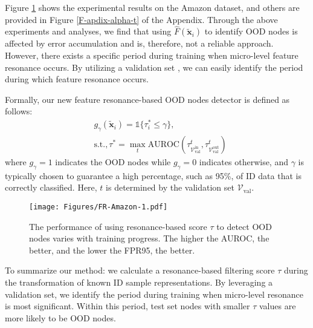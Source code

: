 Figure \ref{F-alpha-t} shows the experimental results on the Amazon dataset, and others are provided in Figure \ref{F-apdix-alpha-t} of the Appendix.  
Through the above experiments and analyses, we find that using $\hat{F}(\tilde{\mathbf{x}}_i)$ to identify OOD nodes is affected by error accumulation and is, therefore, not a reliable approach. However, there exists a specific period during training when micro-level feature resonance occurs. By utilizing a validation set \citep{katz2022training, gong2024energy, du2024does, du2024haloscope}, we can easily identify the period during which feature resonance occurs. 

Formally, our new feature resonance-based OOD nodes detector is defined as follows:
\begin{equation}
    \begin{split}
        &g_{\gamma}(\tilde{\mathbf{x}}_i)= \mathds{1}\{\tau_i^* \leq \gamma\}, \\
        &\text{s.t.}, \tau^*=\max_t \text{AUROC}(\tau^t_{\mathcal{V}_{\mathrm{val}}^{\mathrm{in}}}, \tau^t_{\mathcal{V}_{\mathrm{val}}^{\mathrm{out}}})
    \end{split}
\end{equation}
where $g_{\gamma}=1$ indicates the OOD nodes while $g_{\gamma}=0$ indicates otherwise, and $\gamma$ is typically chosen to guarantee a high percentage, such as 95\%, of ID data that is correctly classified.
Here, $t$ is determined by the validation set $\mathcal{V}_{\text{val}}$. 



\begin{figure}[!t]
	\centering
		\texttt{[image: Figures/FR-Amazon-1.pdf]}
    \caption{The performance of using resonance-based score $\tau$ to detect OOD nodes varies with training progress. The higher the AUROC, the better, and the lower the FPR95, the better.}
    \label{F-alpha-t}
\end{figure}

To summarize our method: we calculate a resonance-based filtering score $\tau$ during the transformation of known ID sample representations. By leveraging a validation set, we identify the period during training when micro-level resonance is most significant. Within this period, test set nodes with smaller $\tau$ values are more likely to be OOD nodes.

